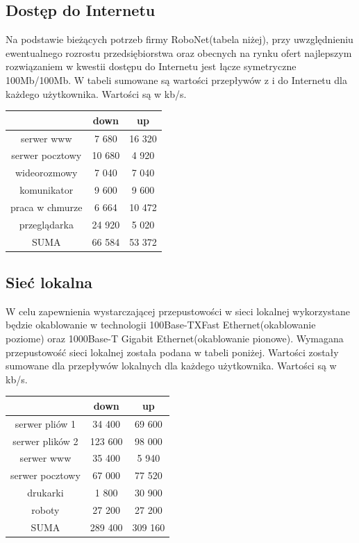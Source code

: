 \documentclass{article}
\begin{document}
\subsection{Dostęp do Internetu}
Na podstawie bieżących potrzeb firmy RoboNet(tabela niżej), przy uwzględnieniu ewentualnego rozrostu przedsiębiorstwa oraz obecnych na rynku ofert najlepszym rozwiązaniem w kwestii dostępu do Internetu jest łącze symetryczne 100Mb/100Mb.\newline
W tabeli sumowane są wartości przepływów z i do Internetu dla każdego użytkownika. Wartości są w kb/s.
\newline
\begin{tabular}{|c|c|c|} \hline
	& down & up \\
	\hline
	serwer www & 7 680 & 16 320\\
	serwer pocztowy & 10 680 & 4 920\\
	wideorozmowy & 7 040 & 7 040 \\
	komunikator & 9 600 & 9 600 \\
	praca w chmurze & 6 664 & 10 472 \\
	przeglądarka & 24 920 & 5 020 \\
	\hline
	\hline
	SUMA & 66 584 & 53 372\\
\hline
\end{tabular}
\subsection{Sieć lokalna}
W celu zapewnienia wystarczającej przepustowości w sieci lokalnej wykorzystane będzie okablowanie w technologii 100Base-TXFast Ethernet(okablowanie poziome) oraz 1000Base-T Gigabit Ethernet(okablowanie pionowe).  Wymagana przepustowość sieci lokalnej została podana w tabeli poniżej. Wartości zostały sumowane dla przepływów lokalnych dla każdego użytkownika. Wartości są w kb/s.
\newline
\begin{tabular}{|c|c|c|} \hline
	& down & up \\
	\hline
	serwer pliów 1 & 34 400 & 69 600\\
	serwer plików 2 & 123 600 & 98 000\\
	serwer www & 35 400 & 5 940\\
	serwer pocztowy & 67 000 & 77 520\\
	drukarki & 1 800 & 30 900\\
	roboty & 27 200 & 27 200\\
	\hline
	\hline
	SUMA & 289 400 & 309 160\\
	\hline
\end{tabular}
\newpage
\end{document}
